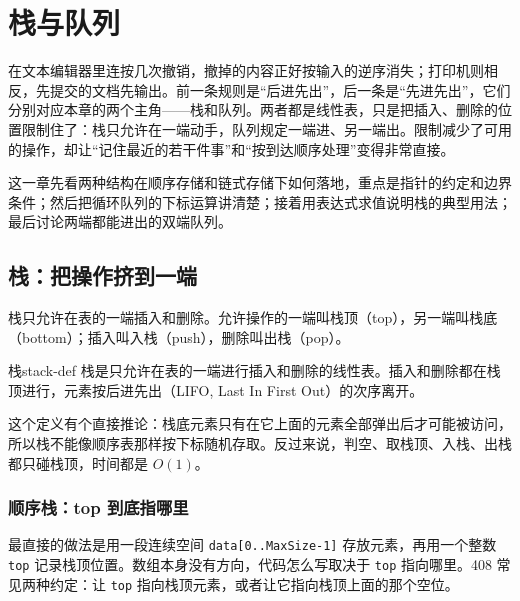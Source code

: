 \section{栈与队列}

在文本编辑器里连按几次撤销，撤掉的内容正好按输入的逆序消失；打印机则相反，先提交的文档先输出。前一条规则是“后进先出”，后一条是“先进先出”，它们分别对应本章的两个主角——栈和队列。两者都是线性表，只是把插入、删除的位置限制住了：栈只允许在一端动手，队列规定一端进、另一端出。限制减少了可用的操作，却让“记住最近的若干件事”和“按到达顺序处理”变得非常直接。

这一章先看两种结构在顺序存储和链式存储下如何落地，重点是指针的约定和边界条件；然后把循环队列的下标运算讲清楚；接着用表达式求值说明栈的典型用法；最后讨论两端都能进出的双端队列。

\subsection{栈：把操作挤到一端}

栈只允许在表的一端插入和删除。允许操作的一端叫栈顶（top），另一端叫栈底（bottom）；插入叫入栈（push），删除叫出栈（pop）。

\begin{mydef}{栈}{stack-def}
栈是只允许在表的一端进行插入和删除的线性表。插入和删除都在栈顶进行，元素按后进先出（LIFO, Last In First Out）的次序离开。
\end{mydef}

这个定义有个直接推论：栈底元素只有在它上面的元素全部弹出后才可能被访问，所以栈不能像顺序表那样按下标随机存取。反过来说，判空、取栈顶、入栈、出栈都只碰栈顶，时间都是 $O(1)$。

\subsubsection*{顺序栈：top 到底指哪里}

最直接的做法是用一段连续空间 \texttt{data[0..MaxSize-1]} 存放元素，再用一个整数 \texttt{top} 记录栈顶位置。数组本身没有方向，代码怎么写取决于 \texttt{top} 指向哪里。408 常见两种约定：让 \texttt{top} 指向栈顶元素，或者让它指向栈顶上面的那个空位。

